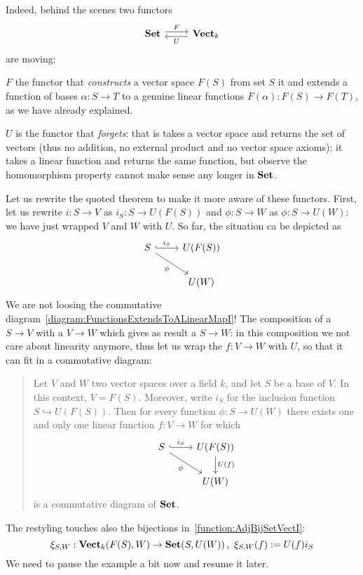 \begin{example}
\begin{figure}
\end{figure}
%
Indeed, behind the scenes two functors
\[\begin{tikzcd}
\Set \ar["F", r, shift left] & \Vect_k \ar["U", l, shift left]
\end{tikzcd}\]
are moving:
%
\begin{tcbitem}
\item \(F\) the functor that {\em constructs} a vector space \(F(S)\) from set \(S\) it and extends a function of bases \(\alpha : S \to T\) to a genuine linear functions \(F(\alpha) : F(S) \to F(T)\), as we have already explained.
\item \(U\) is the functor that {\em forgets}: that is takes a vector space and returns the set of vectors (thus no addition, no external product and no vector space axioms); it takes a linear function and returns the same function, but observe the homomorphism property cannot make sense any longer in \(\mathbf{Set}\).
\end{tcbitem}
%
Let us rewrite the quoted theorem to make it more aware of these functors. First, let us rewrite \(i : S \to V\) as \(i_S : S \to U(F(S))\) and \(\phi : S \to W\) as \(\phi : S \to U(W)\): we have just wrapped \(V\) and \(W\) with \(U\). So far, the situation ca be depicted as
%
\[\begin{tikzcd}
S \ar["{i_S}", r, hook] \ar["\phi", dr, swap] & U(F(S)) \\
& U(W)
\end{tikzcd}\]
%
We are not loosing the commutative diagram~\eqref{diagram:FunctionsExtendsToALinearMapI}! The composition of a  \(S \to V\) with a  \(V \to W\) which gives as result a  \(S \to W\): in this composition we not care about linearity anymore, thus let us wrap the \(f : V \to W\) with \(U\), so that it can fit in a commutative diagram:
%
\begin{quotation}
Let \(V\) and \(W\) two vector spaces over a field \(k\), and let \(S\) be a base of \(V\). In this context, \(V = F(S)\). Moreover, write \(i_S\) for the inclusion function \(S \hookrightarrow U(F(S))\). Then for every function \(\phi : S \to U(W)\) there exists one and only one linear function \(f : V \to W\) for which
\begin{equation}\begin{tikzcd}
S \ar["{i_S}", r, hook] \ar["\phi", dr, swap] & U(F(S)) \ar["U(f)", d] \\
& U(W)
\end{tikzcd}\label{diagram:FunctionsExtendsToALinearMapII}\end{equation}
is a commutative diagram of \(\mathbf{Set}\).
\end{quotation}
%
The restyling touches also the bijections in~\eqref{function:AdjBijSetVectI}:
\begin{equation}\xi_{S,W} : \mathbf{Vect}_k(F(S), W) \to \mathbf{Set}(S, U(W)) \,,\ \xi_{S,W}(f) := U(f)i_S \label{function:AdjBijSetVectII}\end{equation}
We need to pause the example a bit now and resume it later.
\end{example}

